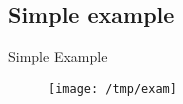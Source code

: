 \subsection{Simple example}
\graphicspath{{./slides/images}}
\begin{frame}{Simple Example}{~}
    \begin{figure}
        
    \center
    \texttt{[image: /tmp/exam]}
    \end{figure}
\end{frame}